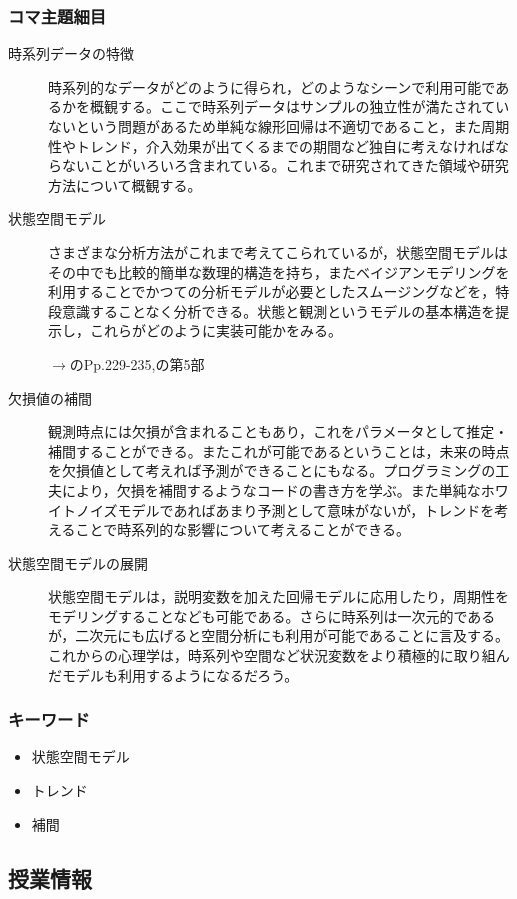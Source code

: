 \subsubsection{コマ主題細目}
\begin{description}
	\item[時系列データの特徴] 時系列的なデータがどのように得られ，どのようなシーンで利用可能であるかを概観する。ここで時系列データはサンプルの独立性が満たされていないという問題があるため単純な線形回帰は不適切であること，また周期性やトレンド，介入効果が出てくるまでの期間など独自に考えなければならないことがいろいろ含まれている。これまで研究されてきた領域や研究方法について概観する。
	\item[状態空間モデル] さまざまな分析方法がこれまで考えてこられているが，状態空間モデルはその中でも比較的簡単な数理的構造を持ち，またベイジアンモデリングを利用することでかつての分析モデルが必要としたスムージングなどを，特段意識することなく分析できる。状態と観測というモデルの基本構造を提示し，これらがどのように実装可能かをみる。
	      \begin{flushright}
		      $\to$\citet{Matsuura201610}のPp.229-235,\citet{Baba2019}の第5部
	      \end{flushright}
	\item[欠損値の補間] 観測時点には欠損が含まれることもあり，これをパラメータとして推定・補間することができる。またこれが可能であるということは，未来の時点を欠損値として考えれば予測ができることにもなる。プログラミングの工夫により，欠損を補間するようなコードの書き方を学ぶ。また単純なホワイトノイズモデルであればあまり予測として意味がないが，トレンドを考えることで時系列的な影響について考えることができる。
	\item[状態空間モデルの展開] 状態空間モデルは，説明変数を加えた回帰モデルに応用したり，周期性をモデリングすることなども可能である。さらに時系列は一次元的であるが，二次元にも広げると空間分析にも利用が可能であることに言及する。これからの心理学は，時系列や空間など状況変数をより積極的に取り組んだモデルも利用するようになるだろう。
\end{description}
\subsubsection{キーワード}
\begin{itemize}
	\item 状態空間モデル
	\item トレンド
	\item 補間
\end{itemize}
\subsection{授業情報}

